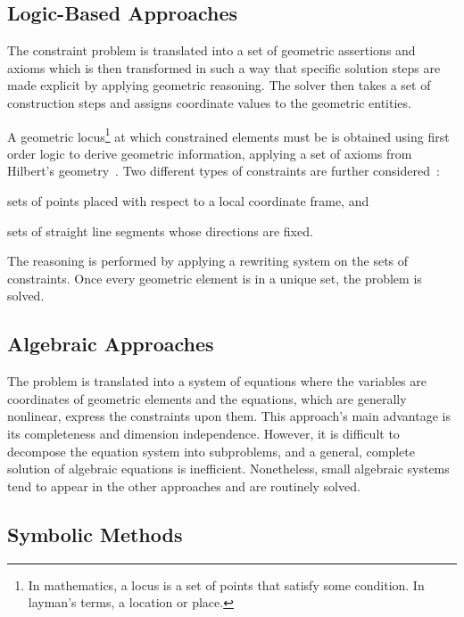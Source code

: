 \subsection{Logic-Based Approaches}%
\label{sec:intro.constraints.logic}

The constraint problem is translated into a set of geometric assertions and
axioms which is then transformed in such a way that specific solution steps are
made explicit by applying geometric reasoning.  The solver then takes a set of
construction steps and assigns coordinate values to the geometric entities.

A geometric locus\footnote{In mathematics, a locus is a set of points that
satisfy some condition.  In layman's terms, a location or place.} at which
constrained elements must be is obtained using first order logic to derive
geometric information, applying a set of axioms from Hilbert's
geometry~\cite{Aldefeld:1988:VGBGRM,Bruderlin:1993:USGRRSGSS,Sohrt:1991:IC3DM}.
Two different types of constraints are further
considered~\cite{Sunde:1987:CADSDSS,Verroust:1992:RMPCAD}:
\begin{enumerate*}[label= (\arabic*)]
  \item sets of points placed with respect to a local coordinate frame, and
  \item sets of straight line segments whose directions are fixed.
\end{enumerate*}
The reasoning is performed by applying a rewriting system on the sets of
constraints.  Once every geometric element is in a unique set, the problem is
solved.

\subsection{Algebraic Approaches}%
\label{sec:intro.constraints.algebraic}

The problem is translated into a system of equations where the variables are
coordinates of geometric elements and the equations, which are generally
nonlinear, express the constraints upon them.  This approach's main advantage is
its completeness and dimension independence.  However, it is difficult to
decompose the equation system into subproblems, and a general, complete solution
of algebraic equations is inefficient.  Nonetheless, small algebraic systems
tend to appear in the other approaches and are routinely solved.

\subsection{Symbolic Methods}%
\label{sec:intro.constraints.symbolic}

